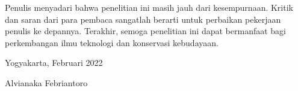 Penulis menyadari bahwa penelitian ini masih jauh dari kesempurnaan. Kritik
dan saran dari para pembaca sangatlah berarti untuk perbaikan pekerjaan penulis ke depannya. Terakhir, semoga penelitian ini dapat bermanfaat bagi perkembangan ilmu teknologi dan konservasi kebudayaan. \par 


\begin{flushright}
Yogyakarta, Februari 2022
\end{flushright}
\vspace{0.5cm}
\begin{flushright}
Alvianaka Febriantoro
\end{flushright}
